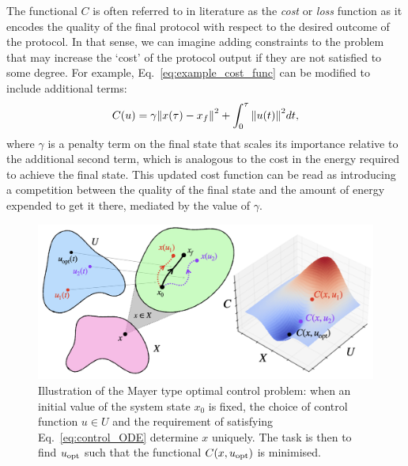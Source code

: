 	The functional $C$ is often referred to in literature as the \emph{cost} or \emph{loss} function \cite{wald_statistical_1950} as it encodes the quality of the final protocol with respect to the desired outcome of the protocol. In that sense, we can imagine adding constraints to the problem that may increase the `cost' of the protocol output if they are not satisfied to some degree. For example, Eq.~\eqref{eq:example_cost_func} can be modified to include additional terms:
\begin{equation}\label{eq:example_cost_func2}
    C(u) = \gamma \norm{x(\tau)  - x_f}^2 + \int_0^{\tau} \norm{u(t)}^2 dt,
\end{equation}
where $\gamma$ is a penalty term on the final state that scales its importance relative to the additional second term, which is analogous to the cost in the energy required to achieve the final state. This updated cost function can be read as introducing a competition between the quality of the final state and the amount of energy expended to get it there, mediated by the value of $\gamma$. 

\begin{figure}[t]
\centering
\includegraphics[width=0.9\linewidth]{images/optimal_control_illustration.png} \caption[Illustration of optimal control problem structure]{Illustration of the Mayer type optimal control problem: when an initial value of the system state $x_0$ is fixed, the choice of control function $u \in U$ and the requirement of satisfying Eq.~\eqref{eq:control_ODE} determine $x$ uniquely. The task is then to find $u_{\rm opt}$ such that the functional $C(x, u_{\rm opt})$ is minimised.}\label{fig:optimal_control}
\end{figure}

